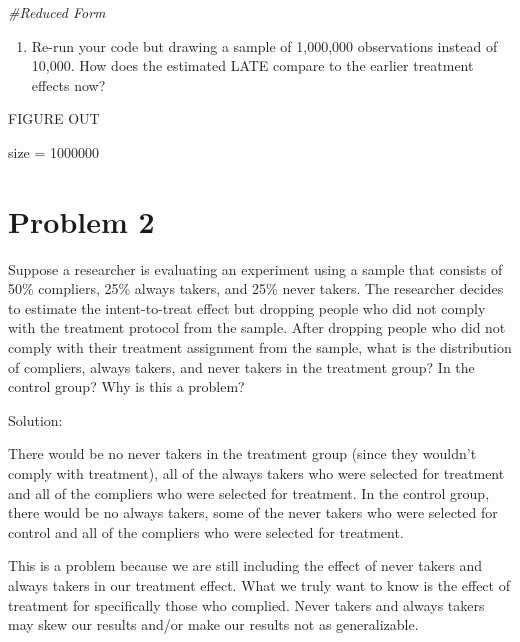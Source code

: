 \documentclass[
]{article}
\newenvironment{Shaded}{\begin{snugshade}}{\end{snugshade}}
\newcommand{\CommentTok}[1]{\textcolor[rgb]{0.56,0.35,0.01}{\textit{#1}}}
\newcommand{\DecValTok}[1]{\textcolor[rgb]{0.00,0.00,0.81}{#1}}
\newcommand{\NormalTok}[1]{#1}
\newcommand{\OtherTok}[1]{\textcolor[rgb]{0.56,0.35,0.01}{#1}}
\providecommand{\tightlist}{%
  \setlength{\itemsep}{0pt}\setlength{\parskip}{0pt}}
\begin{document}
\begin{Shaded}
\begin{Highlighting}[]
\CommentTok{\#Reduced Form}
\end{Highlighting}
\end{Shaded}

\begin{enumerate}
\def\labelenumi{\arabic{enumi}.}
\setcounter{enumi}{6}
\tightlist
\item
  Re-run your code but drawing a sample of 1,000,000 observations
  instead of 10,000. How does the estimated LATE compare to the earlier
  treatment effects now?
\end{enumerate}

FIGURE OUT

\begin{Shaded}
\begin{Highlighting}[]
\NormalTok{size }\OtherTok{=} \DecValTok{1000000}
\end{Highlighting}
\end{Shaded}

\newpage

\hypertarget{problem-2}{%
\section{Problem 2}\label{problem-2}}

Suppose a researcher is evaluating an experiment using a sample that
consists of 50\% compliers, 25\% always takers, and 25\% never takers.
The researcher decides to estimate the intent-to-treat effect but
dropping people who did not comply with the treatment protocol from the
sample. After dropping people who did not comply with their treatment
assignment from the sample, what is the distribution of compliers,
always takers, and never takers in the treatment group? In the control
group? Why is this a problem?

Solution:

There would be no never takers in the treatment group (since they
wouldn't comply with treatment), all of the always takers who were
selected for treatment and all of the compliers who were selected for
treatment. In the control group, there would be no always takers, some
of the never takers who were selected for control and all of the
compliers who were selected for treatment.

This is a problem because we are still including the effect of never
takers and always takers in our treatment effect. What we truly want to
know is the effect of treatment for specifically those who complied.
Never takers and always takers may skew our results and/or make our
results not as generalizable.
\end{document}
